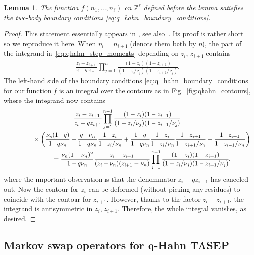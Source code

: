 \documentclass[11pt]{article}
\numberwithin{equation}{section}
\numberwithin{equation}{section}
\newtheorem{Lemma}[Theorem]{Lemma}
\begin{document}
\begin{Lemma}
	\label{lemma:boundary_conditions}
	The function $f(n_1,\ldots,n_\ell )$ on $\mathbb{Z}^{\ell}$ defined before the lemma
	satisfies the two-body boundary conditions
	\eqref{eq:q_hahn_boundary_conditions}.
\end{Lemma}
\begin{proof}
	This statement essentially appears in
	\cite{Corwin2014qmunu}, see also~\cite{BorodinCorwinSasamoto2012}.
	Its proof is rather short so we reproduce it here.
	When $n_i=n_{i+1}$ (denote them both by $n$),
	the part of the integrand in~\eqref{eq:qhahn_step_moments} depending on
	$z_i$, $z_{i+1}$ contains
	\begin{gather*}
		\frac{z_i-z_{i+1}}{z_i-qz_{i+1}}
		\prod_{j=1}^{n}\frac{(1-z_i)(1-z_{i+1})}{(1-z_i/\nu_j)(1-z_{i+1}/\nu_j)}.
	\end{gather*}
	The left-hand side of the boundary conditions
	\eqref{eq:q_hahn_boundary_conditions} for our function $f$
	is an integral over the contours as in Fig.~\ref{fig:qhahn_contours}, where the integrand now contains
	\begin{gather*}
	\frac{z_i-z_{i+1}}{z_i-qz_{i+1}}
	\prod_{j=1}^{n-1}\frac{(1-z_i)(1-z_{i+1})}{(1-z_i/\nu_j)(1-z_{i+1}/\nu_j)}
	\\ \hphantom{\frac{z_i-z_{i+1}}{z_i-qz_{i+1}}}
	{}\times
	\bigg(\frac{\nu_n(1\!-\!q)}{1\!-\!q \nu_n}+\frac{q\!-\!\nu_n}{1\!-\!q \nu_n}\frac{1\!-\!z_i}{1\!-\!z_i/\nu_n}
	+\frac{1\!-\!q}{1\!-\!q \nu_n}\frac{1\!-\!z_i}{1\!-\!z_i/\nu_n}\frac{1\!-\!z_{i+1}}{1\!-\!z_{i+1}/\nu_n}
	-\frac{1\!-\!z_{i+1}}{1\!-\!z_{i+1}/\nu_n}\bigg)
	\\ \hphantom{\frac{z_i-z_{i+1}}{z_i-qz_{i+1}}}
{}=\frac{\nu_n(1-\nu_n)^2}{1-q\nu_n}
	\frac{z_i-z_{i+1}}{(z_i-\nu_n)(z_{i+1}-\nu_n)}
	\prod_{j=1}^{n-1}\frac{(1-z_i)(1-z_{i+1})}{(1-z_i/\nu_j)(1-z_{i+1}/\nu_j)},
	\end{gather*}
	where the important observation is that
	the denominator $z_i-qz_{i+1}$ has
	canceled out. Now the contour for $z_{i}$ can be deformed
	(without picking any residues) to coincide with the contour for $z_{i+1}$.
	However, thanks to the factor $z_i-z_{i+1}$, the integrand is antisymmetric in
	$z_i$, $z_{i+1}$. Therefore, the whole integral vanishes, as desired.
\end{proof}

\subsection[Markov swap operators for q-Hahn TASEP]
{Markov swap operators for $\boldsymbol q$-Hahn TASEP}
\label{sub:cond_distr_qhahn}
\end{document}
